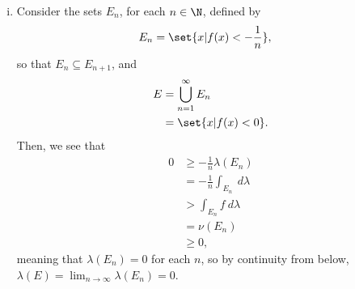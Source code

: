 \documentclass[10pt]{mypackage}
\begin{document}
\begin{enumerate}[(i)]
  \item Consider the sets $E_n$, for each $n\in \N$, defined by
    \begin{align*}
      E_n &= \set{x | f(x) < -\frac{1}{n}},
    \end{align*}
    so that $E_n \subseteq E_{n+1}$, and
    \begin{align*}
      E &= \bigcup_{n=1}^{\infty} E_n\\
        &= \set{x | f(x) < 0}.
    \end{align*}
    Then, we see that 
    \begin{align*}
      0 &\geq -\frac{1}{n}\lambda\left( E_n \right)\\
        &= -\frac{1}{n} \int_{E_n}^{} \:d\lambda\\
                                          &> \int_{E_n}^{} f\:d\lambda\\
                                          &= \nu\left( E_n \right)\\
                                          &\geq 0,
    \end{align*}
    meaning that $\lambda\left( E_n \right) = 0$ for each $n$, so by continuity from below, $\lambda\left( E \right) = \lim_{n\rightarrow\infty} \lambda\left( E_n \right) = 0$.\newline


\end{enumerate}
\end{document}
